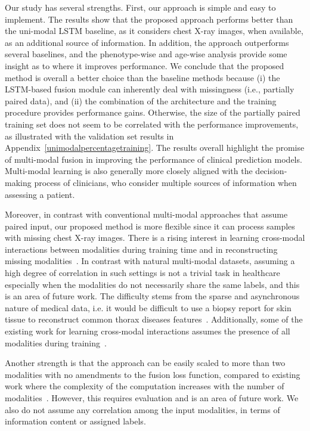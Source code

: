 \documentclass[pmlr]{jmlr}
\begin{document}
Our study has several strengths. First, our approach is simple and easy to implement. The results show that the proposed approach performs better than the uni-modal LSTM baseline, as it considers chest X-ray images, when available, as an additional source of information. In addition, the approach outperforms several baselines, and the phenotype-wise and age-wise analysis provide some insight as to where it improves performance. We conclude that the proposed method is overall a better choice than the baseline methods because (i) the LSTM-based fusion module can inherently deal with missingness (i.e., partially paired data), and (ii) the combination of the architecture and the training procedure provides performance gains. Otherwise, the size of the partially paired training set does not seem to be correlated with the performance improvements, as illustrated with the validation set results in Appendix~\ref{unimodalpercentagetraining}. The results overall highlight the promise of multi-modal fusion in improving the performance of clinical prediction models. Multi-modal learning is also generally more closely aligned with the decision-making process of clinicians, who consider multiple sources of information when assessing a patient. 


Moreover, in contrast with conventional multi-modal approaches that assume paired input, our proposed method is more flexible since it can process samples with missing chest X-ray images. There is a rising interest in learning cross-modal interactions between modalities during training time and in reconstructing missing modalities~\citep{ngiam2011multimodal, 9534148,missing, sylvain2021cmim,missing}. In contrast with natural multi-modal datasets, assuming a high degree of correlation in such settings is not a trivial task in healthcare especially when the modalities do not necessarily share the same labels, and this is an area of future work. The difficulty stems from the sparse and asynchronous nature of medical data, i.e. it would be difficult to use a biopsy report for skin tissue to reconstruct common thorax diseases features~\citep{hayat2021dynamic}. Additionally, some of the existing work for learning cross-modal interactions assumes the presence of all modalities during training~\citep{sylvain2021cmim}. 


Another strength is that the approach can be easily scaled to more than two modalities with no amendments to the fusion loss function, compared to existing work where the complexity of the computation increases with the number of modalities~\citep{hayat2021dynamic}. However, this requires evaluation and is an area of future work. We also do not assume any correlation among the input modalities, in terms of information content or assigned labels. 
\end{document}
